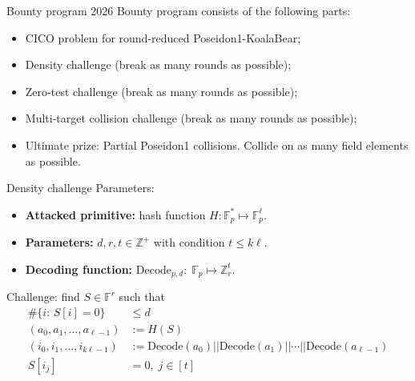 \documentclass[t,8pt]{beamer}
\begin{document}
\begin{frame}{Bounty program 2026}
   Bounty program consists of the following parts:
    \begin{itemize}
        \item CICO problem for round-reduced Poseidon1-KoalaBear;
        \item Density challenge (break as many rounds as possible);
        \item Zero-test challenge (break as many rounds as possible);
        \item Multi-target collision challenge (break as many rounds as possible);
        \item Ultimate prize: Partial Poseidon1 collisions. Collide on as many field elements as possible.
    \end{itemize}
\end{frame}


\begin{frame}{Density challenge}
    Parameters:
\begin{itemize}
    \item
\textbf{Attacked primitive:} hash function $H:\mathbb{F}_p^{*}\mapsto \mathbb{F}_p^{\ell}$.
\item
\textbf{Parameters:} $d,r,t\in\mathbb{Z}^{+}$ with condition $t\leq k\ell$.

\item \textbf{Decoding function:} $\mathrm{Decode}_{p,d}:\;\mathbb{F}_p\mapsto \mathbb{Z}_r^t$.
\end{itemize}
Challenge: find $S\in\mathbb{F}^r$ such that
\begin{align}
\#\{i:\,S[i]=0\}&\leq d\\
(a_0,a_1,\ldots,a_{\ell-1}) &:=H(S) \\
(i_0,i_1,\ldots,i_{k\ell-1})&:=\mathrm{Decode}(a_0)||\mathrm{Decode}(a_1)||\cdots||\mathrm{Decode}(a_{\ell-1})\\
S[i_j]&=0,\; j\in[t]
\end{align}
\end{frame}
\end{document}
